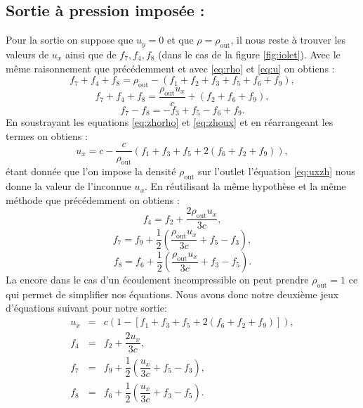     \subsection{\bf Sortie à pression imposée :}
      Pour la sortie on suppose que $u_y = 0$ et que $\rho = \rho_\text{out}$, il nous reste à trouver les valeurs de 
      $u_x$ ainsi que de $f_7, f_4, f_8$ (dans le cas de la figure \ref{fig:iolet}).
      Avec le même raisonnement que précédemment et avec \ref{eq:rho} et \ref{eq:u} on obtiens :
      \begin{equation} \label{eq:zhorho}
        f_7 + f_4 + f_8 = \rho_\text{out} - (f_1 + f_2 + f_3 + f_5 + f_6 + f_9),
      \end{equation}      
      \begin{equation} \label{eq:zhoux}
        f_7 + f_4 + f_8 = \frac{\rho_\text{out} u_x}{c} + ( f_2 + f_6 + f_9),
      \end{equation}
      \begin{equation} \label{eq:zhouy}
        f_7 - f_8 = - f_3 + f_5 - f_6 + f_9.
      \end{equation}
      En soustrayant les equations \ref{eq:zhorho} et \ref{eq:zhoux} et en réarrangeant les termes on obtiens :
      \begin{equation} \label{eq:uxzh}
        u_x = c - \frac{c}{\rho_\text{out}}(f_1 + f_3 + f_5 + 2( f_6 + f_2 + f_9)),
      \end{equation}
      étant donnée que l'on impose la densité $\rho_\text{out}$ sur l'outlet l'équation \ref{eq:uxzh} nous donne la 
      valeur de l'inconnue $u_x$. 
      En réutilisant la même hypothèse et la même méthode que précédemment on obtiens :
      \begin{equation} \label{eq:f4zh}
        f_4 = f_2 + \dfrac{2\rho_\text{out} u_x}{3c},
      \end{equation}
      \begin{equation} \label{eq:f7zh}
        f_7 = f_9 + \dfrac{1}{2}\left( \dfrac{\rho_\text{out} u_x}{3c} + f_5 - f_3 \right),
      \end{equation}
      \begin{equation} \label{eq:f8zh}
        f_8 = f_6 + \dfrac{1}{2}\left(\dfrac{\rho_\text{out} u_x}{3c} + f_3 - f_5 \right).
      \end{equation}
      La encore dans le cas d'un écoulement incompressible on peut prendre $\rho_\text{out} = 1$ ce qui permet de 
      simplifier nos équations.  
      Nous avons donc notre deuxième jeux d'équations suivant pour notre sortie:
      \begin{equation} \label{eq:poutlet}  
        \begin{array}{rcl}
          u_x &=& c(1 - [f_1 + f_3 + f_5 + 2( f_6 + f_2 + f_9)]),\\
          f_4 &=& f_2 + \dfrac{2 u_x}{3c},\\
          f_7 &=& f_9 + \dfrac{1}{2}\left( \dfrac{u_x}{3c} + f_5 - f_3 \right),\\
          f_8 &=& f_6 + \dfrac{1}{2}\left(\dfrac{u_x}{3c} + f_3 - f_5 \right).
        \end{array}
      \end{equation}

